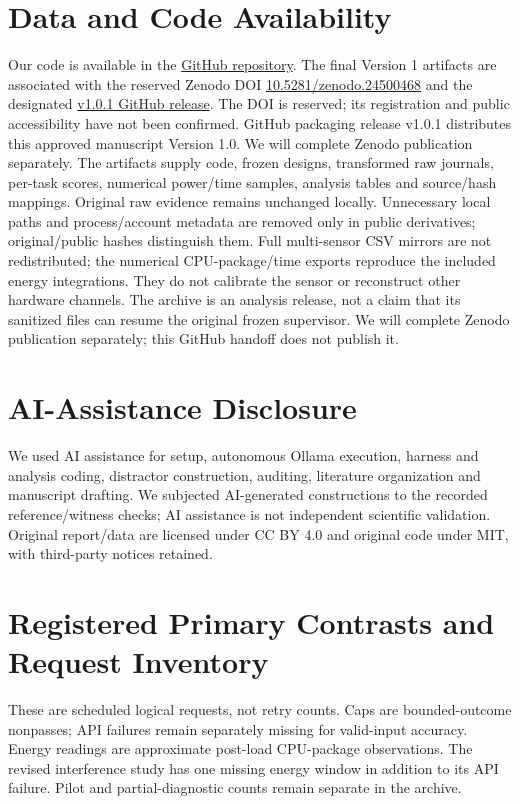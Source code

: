 \documentclass[10pt,a4paper,twocolumn]{article}
\begin{document}
\section{Data and Code Availability}
\begingroup\raggedright
Our code is available in the
\href{https://github.com/buildgit17626-ctrl/Memory-Under-Interference-}{GitHub repository}.
The final Version 1 artifacts are associated with the reserved Zenodo DOI
\href{https://doi.org/10.5281/zenodo.24500468}{10.5281/zenodo.24500468}
and the designated
\href{https://github.com/buildgit17626-ctrl/Memory-Under-Interference-/releases/tag/v1.0.1}{v1.0.1 GitHub release}.
The DOI is reserved; its registration and public accessibility have not been
confirmed. GitHub packaging release v1.0.1 distributes this approved manuscript Version 1.0.
We will complete Zenodo publication separately. The artifacts supply code,
frozen designs, transformed raw journals,
per-task scores, numerical power/time samples, analysis tables and source/hash
mappings. Original raw evidence remains unchanged locally. Unnecessary local
paths and process/account metadata are removed only in public derivatives;
original/public hashes distinguish them. Full multi-sensor CSV mirrors are not
redistributed; the numerical CPU-package/time exports reproduce the included
energy integrations. They do not calibrate the sensor or reconstruct other
hardware channels. The archive is an analysis release, not a claim that its
sanitized files can resume the original frozen supervisor. We will complete Zenodo publication separately; this GitHub handoff does not publish it.
\par\endgroup

\section{AI-Assistance Disclosure}
We used AI assistance for setup, autonomous Ollama execution,
harness and analysis coding, distractor construction, auditing, literature
organization and manuscript drafting. We subjected AI-generated constructions
to the recorded reference/witness checks; AI assistance is not independent
scientific validation. Original report/data are licensed under CC BY 4.0 and original code
under MIT, with third-party notices retained.
\label{maintext:end}

\begingroup
\footnotesize
\setlength{\bibsep}{3pt}


\endgroup
\onecolumn
\appendix
\section{Registered Primary Contrasts and Request Inventory}
\begin{center}\small\end{center}
These are scheduled logical requests, not retry counts. Caps are bounded-outcome
nonpasses; API failures remain separately missing for valid-input accuracy.
Energy readings are approximate post-load CPU-package observations. The revised
interference study has one missing energy window in addition to its API failure.
Pilot and partial-diagnostic counts remain separate in the archive.
\end{document}
